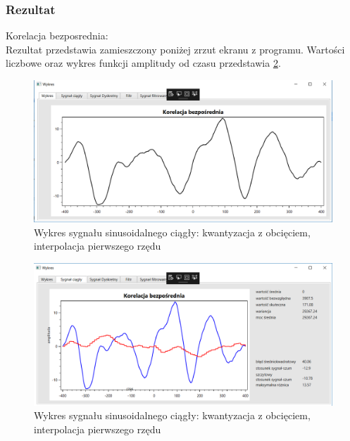 \documentclass[12pt]{article}
\begin{document}
\subsubsection{Rezultat}

Korelacja bezposrednia:
\\Rezultat przedstawia zamieszczony poniżej zrzut ekranu z programu. Wartości liczbowe oraz wykres funkcji amplitudy od czasu przedstawia \ref{Wykres dla wynikw eksperymentu pierwszego}.
\begin{figure}[h!]
 \centering
 \includegraphics[width=12.3cm]{korB.PNG}
 \vspace{-0.3cm}
 \caption{Wykres sygnału sinusoidalnego ciągły: kwantyzacja z obcięciem, interpolacja pierwszego rzędu}
 \label{Wykres dla wynikw eksperymentu pierwszego}
\end{figure}
 \newpage
\begin{figure}[h!]
 \centering
 \includegraphics[width=12.3cm]{korBC.PNG}
 \vspace{-0.3cm}
 \caption{Wykres sygnału sinusoidalnego ciągły: kwantyzacja z obcięciem, interpolacja pierwszego rzędu}
 \label{Wykres dla wynikw eksperymentu pierwszego}
\end{figure}
\end{document}
